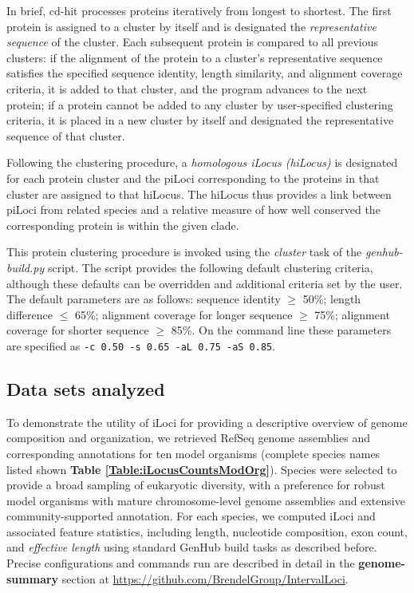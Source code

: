 In brief, cd-hit processes proteins iteratively from longest to shortest.
The first protein is assigned to a cluster by itself and is designated the \textit{representative sequence} of the cluster.
Each subsequent protein is compared to all previous clusters:
if the alignment of the protein to a cluster's representative sequence satisfies the specified sequence identity, length similarity, and alignment coverage criteria, it is added to that cluster, and the program advances to the next protein;
if a protein cannot be added to any cluster by user-specified clustering criteria, it is placed in a new cluster by itself and designated the representative sequence of that cluster.

Following the clustering procedure, a \textit{homologous iLocus (hiLocus)} is designated for each protein cluster and the piLoci corresponding to the proteins in that cluster are assigned to that hiLocus.
The hiLocus thus provides a link between piLoci from related species and a relative measure of how well conserved the corresponding protein is within the given clade.

This protein clustering procedure is invoked using the \textit{cluster} task of the \textit{genhub-build.py} script.
The script provides the following default clustering criteria, although these defaults can be overridden and additional criteria set by the user.
The default parameters are as follows: sequence identity $\geq$ 50\%; length difference $\leq$ 65\%; alignment coverage for longer sequence $\geq$ 75\%; alignment coverage for shorter sequence $\geq$ 85\%.
On the command line these parameters are specified as \texttt{-c 0.50 -s 0.65 -aL 0.75 -aS 0.85}.


\subsection{Data sets analyzed}
To demonstrate the utility of iLoci for providing a descriptive overview of genome composition and organization, we retrieved RefSeq genome assemblies and corresponding annotations for ten model organisms (complete species names listed shown \textbf{Table \ref{Table:iLocusCountsModOrg}}).
Species were selected to provide a broad sampling of eukaryotic diversity, with a preference for robust model organisms with mature chromosome-level genome assemblies and extensive community-supported annotation.
For each species, we computed iLoci and associated feature statistics, including length, nucleotide composition, exon count, and \textit{effective length} using standard GenHub build tasks as described before.
Precise configurations and commands run are described in detail in the \textbf{genome-summary} section at \url{https://github.com/BrendelGroup/IntervalLoci}.

